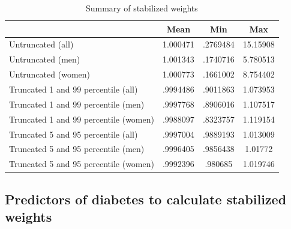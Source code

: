 \begin{table}[h]
\caption{\label{tab:stabweights}Summary of stabilized weights}
\begin{adjustbox}{max width=\linewidth}  
{
\def\sym#1{\ifmmode^{#1}\else\(^{#1}\)\fi}
\begin{tabular}{l*{1}{ccc}}
\toprule
                    &        Mean&         Min&         Max\\
\midrule
Untruncated (all)   &    1.000471&    .2769484&    15.15908\\
Untruncated (men)   &    1.001343&    .1740716&   5.780513\\
Untruncated (women) &    1.000773&   .1661002&  8.754402\\
Truncated 1 and 99 percentile (all)&    .9994486&    .9011863&    1.073953\\
Truncated 1 and 99 percentile (men)&    .9997768&    .8906016&    1.107517\\
Truncated 1 and 99 percentile (women)&    .9988097&    .8323757&    1.119154\\
Truncated 5 and 95 percentile (all)&    .9997004&    .9889193&    1.013009\\
Truncated 5 and 95 percentile (men)&    .9996405&    .9856438  & 1.01772\\
Truncated 5 and 95 percentile (women)&    .9992396 &    .980685  & 1.019746\\
\bottomrule
\end{tabular}
}
\end{adjustbox}
\end{table}

\FloatBarrier

\subsection*{Predictors of diabetes to calculate stabilized weights}

